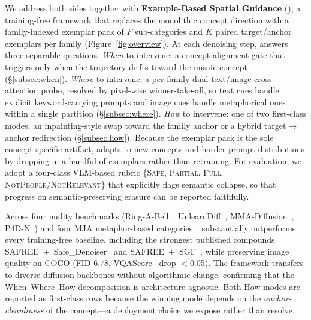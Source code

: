 We address both sides together with \textbf{Example-Based Spatial Guidance} (\ours{}), a training-free framework that replaces the monolithic concept direction with a family-indexed exemplar pack of $F$ sub-categories and $K$ paired target/anchor exemplars per family (Figure~\ref{fig:overview}). At each denoising step, \ours{} answers three separable questions. \emph{When} to intervene: a concept-alignment gate that triggers only when the trajectory drifts toward the unsafe concept (\S\ref{subsec:when}). \emph{Where} to intervene: a per-family dual text/image cross-attention probe, resolved by pixel-wise winner-take-all, so text cues handle explicit keyword-carrying prompts and image cues handle metaphorical ones within a single partition (\S\ref{subsec:where}). \emph{How} to intervene: one of two first-class modes, an inpainting-style swap toward the family anchor or a hybrid target$\to$anchor redirection (\S\ref{subsec:how}). Because the exemplar pack is the sole concept-specific artifact, \ours{} adapts to new concepts and harder prompt distributions by dropping in a handful of exemplars rather than retraining. For evaluation, we adopt a four-class VLM-based rubric \{\textsc{Safe}, \textsc{Partial}, \textsc{Full}, \textsc{NotPeople/NotRelevant}\} that explicitly flags semantic collapse, so that progress on semantic-preserving erasure can be reported faithfully.

Across four nudity benchmarks (Ring-A-Bell~\citep{tsai2023ring}, UnlearnDiff~\citep{zhang2024generate}, MMA-Diffusion~\citep{yang2024mma}, P4D-N~\citep{chin2023prompting4debugging}) and four MJA metaphor-based categories~\citep{zhang2026reason2attack}, \ours{} substantially outperforms every training-free baseline, including the strongest published compounds SAFREE~$+$~Safe\_Denoiser~\citep{kim2025training} and SAFREE~$+$~SGF~\citep{kim2026safety}, while preserving image quality on COCO (FID 6.78, VQAScore~\citep{lin2024evaluating} drop $<$0.05). The framework transfers to diverse diffusion backbones without algorithmic change, confirming that the When--Where--How decomposition is architecture-agnostic. Both How modes are reported as first-class rows because the winning mode depends on the \emph{anchor-cleanliness} of the concept---a deployment choice we expose rather than resolve.
